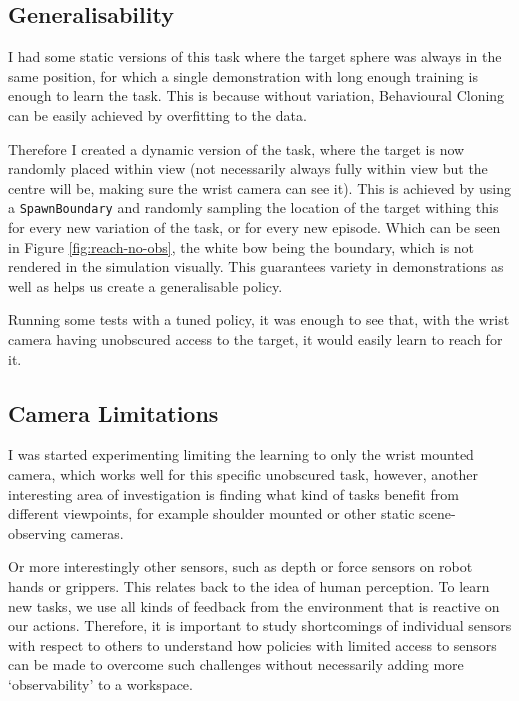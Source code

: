 \subsection{Generalisability}
I had some static versions of this task where the target sphere was always in the same position, for which a single demonstration with long enough training is enough to learn the task. This is because without variation, Behavioural Cloning can be easily achieved by overfitting to the data. 

Therefore I created a dynamic version of the task, where the target is now randomly placed within view (not necessarily always fully within view but the centre will be, making sure the wrist camera can see it). This is achieved by using a \verb|SpawnBoundary| and randomly sampling the location of the target withing this for every new variation of the task, or for every new episode. Which can be seen in Figure \ref{fig:reach-no-obs}, the white bow being the boundary, which is not rendered in the simulation visually. This guarantees variety in demonstrations as well as helps us create a generalisable policy.

Running some tests with a tuned  policy, it was enough to see that, with the wrist camera having unobscured access to the target, it would easily learn to reach for it.


\subsection{Camera Limitations}

I was started experimenting limiting the learning to only the wrist mounted camera, which works well for this specific unobscured task, however, another interesting area of investigation is finding what kind of tasks benefit from different viewpoints, for example shoulder mounted or other static scene-observing cameras. 

Or more interestingly other sensors, such as depth or force sensors on robot hands or grippers. This relates back to the idea of human perception. To learn new tasks, we use all kinds of feedback from the environment that is reactive on our actions. Therefore, it is important to study shortcomings of individual sensors with respect to others to understand how policies with limited access to sensors can be made to overcome such challenges without necessarily adding more `observability' to a workspace.

